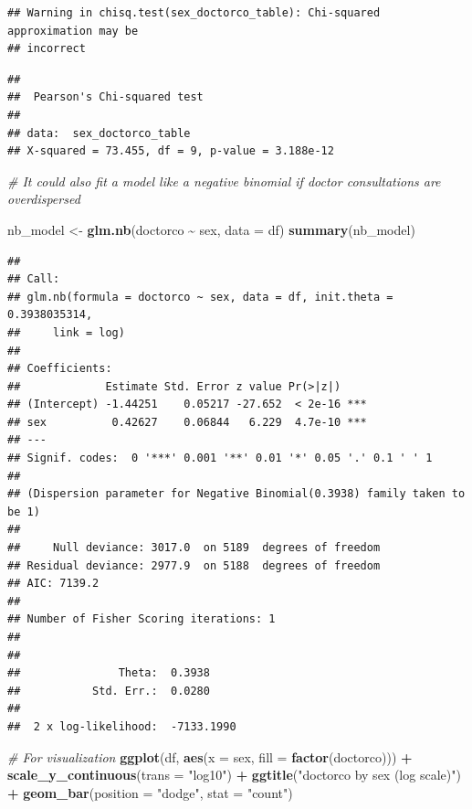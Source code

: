 \documentclass[
]{article}
\newenvironment{Shaded}{\begin{snugshade}}{\end{snugshade}}
\newcommand{\AttributeTok}[1]{\textcolor[rgb]{0.13,0.29,0.53}{#1}}
\newcommand{\CommentTok}[1]{\textcolor[rgb]{0.56,0.35,0.01}{\textit{#1}}}
\newcommand{\FunctionTok}[1]{\textcolor[rgb]{0.13,0.29,0.53}{\textbf{#1}}}
\newcommand{\NormalTok}[1]{#1}
\newcommand{\OtherTok}[1]{\textcolor[rgb]{0.56,0.35,0.01}{#1}}
\newcommand{\SpecialCharTok}[1]{\textcolor[rgb]{0.81,0.36,0.00}{\textbf{#1}}}
\newcommand{\StringTok}[1]{\textcolor[rgb]{0.31,0.60,0.02}{#1}}
\begin{document}
\begin{verbatim}
## Warning in chisq.test(sex_doctorco_table): Chi-squared approximation may be
## incorrect
\end{verbatim}

\begin{verbatim}
## 
##  Pearson's Chi-squared test
## 
## data:  sex_doctorco_table
## X-squared = 73.455, df = 9, p-value = 3.188e-12
\end{verbatim}

\begin{Shaded}
\begin{Highlighting}[]
\CommentTok{\# It could also fit a model like a negative binomial if doctor consultations are overdispersed}

\NormalTok{nb\_model }\OtherTok{\textless{}{-}} \FunctionTok{glm.nb}\NormalTok{(doctorco }\SpecialCharTok{\textasciitilde{}}\NormalTok{ sex, }\AttributeTok{data =}\NormalTok{ df)}
\FunctionTok{summary}\NormalTok{(nb\_model)}
\end{Highlighting}
\end{Shaded}

\begin{verbatim}
## 
## Call:
## glm.nb(formula = doctorco ~ sex, data = df, init.theta = 0.3938035314, 
##     link = log)
## 
## Coefficients:
##             Estimate Std. Error z value Pr(>|z|)    
## (Intercept) -1.44251    0.05217 -27.652  < 2e-16 ***
## sex          0.42627    0.06844   6.229  4.7e-10 ***
## ---
## Signif. codes:  0 '***' 0.001 '**' 0.01 '*' 0.05 '.' 0.1 ' ' 1
## 
## (Dispersion parameter for Negative Binomial(0.3938) family taken to be 1)
## 
##     Null deviance: 3017.0  on 5189  degrees of freedom
## Residual deviance: 2977.9  on 5188  degrees of freedom
## AIC: 7139.2
## 
## Number of Fisher Scoring iterations: 1
## 
## 
##               Theta:  0.3938 
##           Std. Err.:  0.0280 
## 
##  2 x log-likelihood:  -7133.1990
\end{verbatim}

\begin{Shaded}
\begin{Highlighting}[]
\CommentTok{\# For visualization}
\FunctionTok{ggplot}\NormalTok{(df, }\FunctionTok{aes}\NormalTok{(}\AttributeTok{x =}\NormalTok{ sex, }\AttributeTok{fill =} \FunctionTok{factor}\NormalTok{(doctorco))) }\SpecialCharTok{+} 
  \FunctionTok{scale\_y\_continuous}\NormalTok{(}\AttributeTok{trans =} \StringTok{"log10"}\NormalTok{) }\SpecialCharTok{+}
  \FunctionTok{ggtitle}\NormalTok{(}\StringTok{"\textquotesingle{}doctorco\textquotesingle{} by sex (log scale)"}\NormalTok{) }\SpecialCharTok{+}
  \FunctionTok{geom\_bar}\NormalTok{(}\AttributeTok{position =} \StringTok{"dodge"}\NormalTok{, }\AttributeTok{stat =} \StringTok{"count"}\NormalTok{)}
\end{Highlighting}
\end{Shaded}
\end{document}
